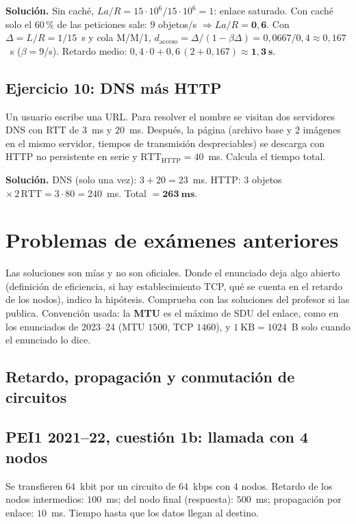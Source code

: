 \documentclass[11pt,a4paper]{article}
\begin{document}
\textbf{Solución.} Sin caché, $La/R=15\cdot10^{6}/15\cdot10^{6}=1$: enlace saturado. Con caché solo el $60$\,\% de las peticiones sale: $9$ objetos/s $\Rightarrow La/R=\mathbf{0{,}6}$. Con $\Delta=L/R=1/15$~s y cola M/M/1, $d_{\text{acceso}}=\Delta/(1-\beta\Delta)=0{,}0667/0{,}4\approx0{,}167$~s ($\beta=9$/s).
Retardo medio: $0{,}4\cdot0+0{,}6\,(2+0{,}167)\approx\mathbf{1{,}3~s}$.

\subsection*{Ejercicio 10: DNS más HTTP}
Un usuario escribe una URL. Para resolver el nombre se visitan dos servidores DNS con RTT de $3$~ms y $20$~ms. Después, la página (archivo base y $2$ imágenes en el mismo servidor, tiempos de transmisión despreciables) se descarga con HTTP no persistente en serie y $\text{RTT}_{\text{HTTP}}=40$~ms. Calcula el tiempo total.

\textbf{Solución.} DNS (solo una vez): $3+20=23$~ms. HTTP: $3$ objetos $\times\,2\,\text{RTT}=3\cdot80=240$~ms. Total $=\mathbf{263~ms}$.

\newpage
\section{Problemas de exámenes anteriores}

\begin{nota}
Las soluciones son mías y no son oficiales. Donde el enunciado deja algo abierto (definición de eficiencia, si hay establecimiento TCP, qué se cuenta en el retardo de los nodos), indico la hipótesis. Comprueba con las soluciones del profesor si las publica. Convención usada: la \textbf{MTU} es el máximo de SDU del enlace, como en los enunciados de 2023--24 (MTU $1500$, TCP $1460$), y $1~\text{KB}=1024$~B solo cuando el enunciado lo dice.
\end{nota}

\subsection{Retardo, propagación y conmutación de circuitos}

\subsection*{PEI1 2021--22, cuestión 1b: llamada con 4 nodos}
Se transfieren $64$~kbit por un circuito de $64$~kbps con $4$ nodos. Retardo de los nodos intermedios: $100$~ms; del nodo final (respuesta): $500$~ms; propagación por enlace: $10$~ms. Tiempo hasta que los datos llegan al destino.
\end{document}
